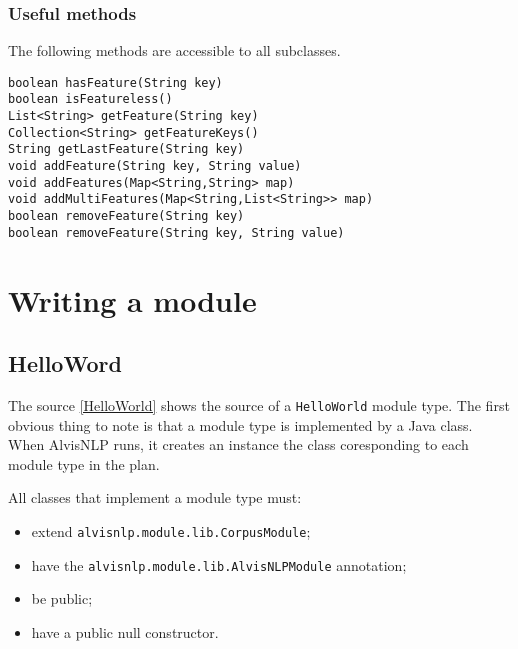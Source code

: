 \documentclass[a4paper]{article}
\begin{document}
\subsubsection{Useful methods}

The following methods are accessible to all subclasses.

\texttt{boolean hasFeature(String key)}\\
\texttt{boolean isFeatureless()}\\
\texttt{List<String> getFeature(String key)}\\
\texttt{Collection<String> getFeatureKeys()}\\
\texttt{String getLastFeature(String key)}\\
\texttt{void addFeature(String key, String value)}\\
\texttt{void addFeatures(Map<String,String> map)}\\
\texttt{void addMultiFeatures(Map<String,List<String>> map)}\\
\texttt{boolean removeFeature(String key)}\\
\texttt{boolean removeFeature(String key, String value)}\\


\section{Writing a module}

\subsection{HelloWord}

The source \ref{HelloWorld} shows the source of a \texttt{HelloWorld} module type.
The first obvious thing to note is that a module type is implemented by a Java class.
When AlvisNLP runs, it creates an instance the class coresponding to each module type in the plan.


All classes that implement a module type must:
\begin{itemize}
\item extend \texttt{alvisnlp.module.lib.CorpusModule};
\item have the \texttt{alvisnlp.module.lib.AlvisNLPModule} annotation;
\item be public;
\item have a public null constructor.
\end{itemize}
\end{document}
